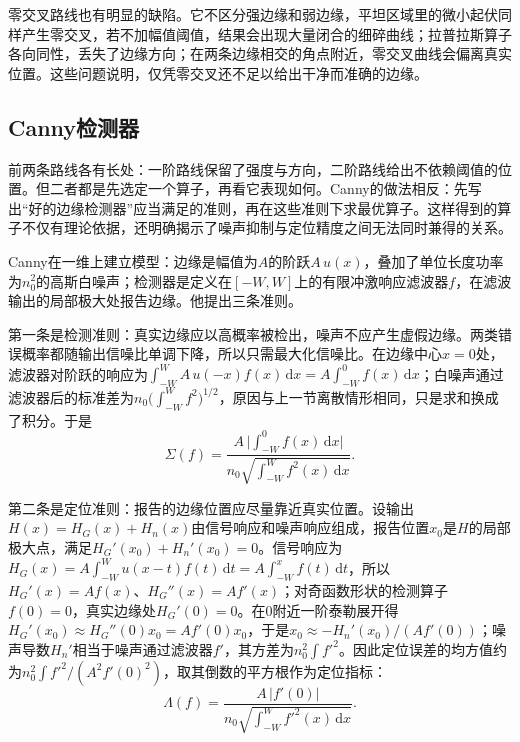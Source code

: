 零交叉路线也有明显的缺陷。它不区分强边缘和弱边缘，平坦区域里的微小起伏同样产生零交叉，若不加幅值阈值，结果会出现大量闭合的细碎曲线；拉普拉斯算子各向同性，丢失了边缘方向；在两条边缘相交的角点附近，零交叉曲线会偏离真实位置。这些问题说明，仅凭零交叉还不足以给出干净而准确的边缘。

\subsection{Canny检测器}
\label{sec:vision-features-canny}

前两条路线各有长处：一阶路线保留了强度与方向，二阶路线给出不依赖阈值的位置。但二者都是先选定一个算子，再看它表现如何。Canny的做法相反：先写出“好的边缘检测器”应当满足的准则，再在这些准则下求最优算子。这样得到的算子不仅有理论依据，还明确揭示了噪声抑制与定位精度之间无法同时兼得的关系。

Canny在一维上建立模型：边缘是幅值为$A$的阶跃$A\,u(x)$，叠加了单位长度功率为$n_0^2$的高斯白噪声；检测器是定义在$[-W,W]$上的有限冲激响应滤波器$f$，在滤波输出的局部极大处报告边缘。他提出三条准则。

第一条是检测准则：真实边缘应以高概率被检出，噪声不应产生虚假边缘。两类错误概率都随输出信噪比单调下降，所以只需最大化信噪比。在边缘中心$x=0$处，滤波器对阶跃的响应为$\int_{-W}^{W}A\,u(-x)f(x)\,\mathrm dx=A\int_{-W}^{0}f(x)\,\mathrm dx$；白噪声通过滤波器后的标准差为$n_0\bigl(\int_{-W}^{W}f^2\bigr)^{1/2}$，原因与上一节离散情形相同，只是求和换成了积分。于是
\begin{equation}
  \Sigma(f)=\frac{A\,\bigl\lvert\int_{-W}^{0}f(x)\,\mathrm dx\bigr\rvert}{n_0\sqrt{\int_{-W}^{W}f^2(x)\,\mathrm dx}}.
  \label{eq:vision-features-canny-snr}
\end{equation}

第二条是定位准则：报告的边缘位置应尽量靠近真实位置。设输出$H(x)=H_G(x)+H_n(x)$由信号响应和噪声响应组成，报告位置$x_0$是$H$的局部极大点，满足$H_G'(x_0)+H_n'(x_0)=0$。信号响应为$H_G(x)=A\int_{-W}^{W}u(x-t)f(t)\,\mathrm dt=A\int_{-W}^{x}f(t)\,\mathrm dt$，所以$H_G'(x)=Af(x)$、$H_G''(x)=Af'(x)$；对奇函数形状的检测算子$f(0)=0$，真实边缘处$H_G'(0)=0$。在$0$附近一阶泰勒展开得$H_G'(x_0)\approx H_G''(0)x_0=Af'(0)x_0$，于是$x_0\approx-H_n'(x_0)/(Af'(0))$；噪声导数$H_n'$相当于噪声通过滤波器$f'$，其方差为$n_0^2\int f'^2$。因此定位误差的均方值约为$n_0^2\int f'^2/(A^2f'(0)^2)$，取其倒数的平方根作为定位指标：
\begin{equation}
  \Lambda(f)=\frac{A\,\lvert f'(0)\rvert}{n_0\sqrt{\int_{-W}^{W}f'^2(x)\,\mathrm dx}}.
  \label{eq:vision-features-canny-localization}
\end{equation}

